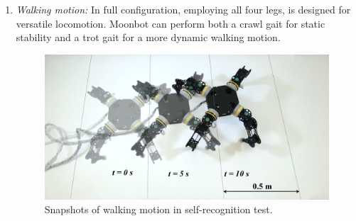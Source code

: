 \begin{enumerate}
\item \textit {Walking motion:}
In full configuration, employing all four legs, is designed for versatile locomotion. Moonbot can perform both a crawl gait for static stability and a trot gait for a more dynamic walking motion. \\


\begin{figure}[h]
  \centering
  \includegraphics[width=110mm]{./fig/chap3/snapshot/full_snapshot4.png}
  \vspace{2mm}
  \caption{Snapshots of walking motion in self-recognition test.}\label{fullsnap}
\end{figure}


\end{enumerate}
